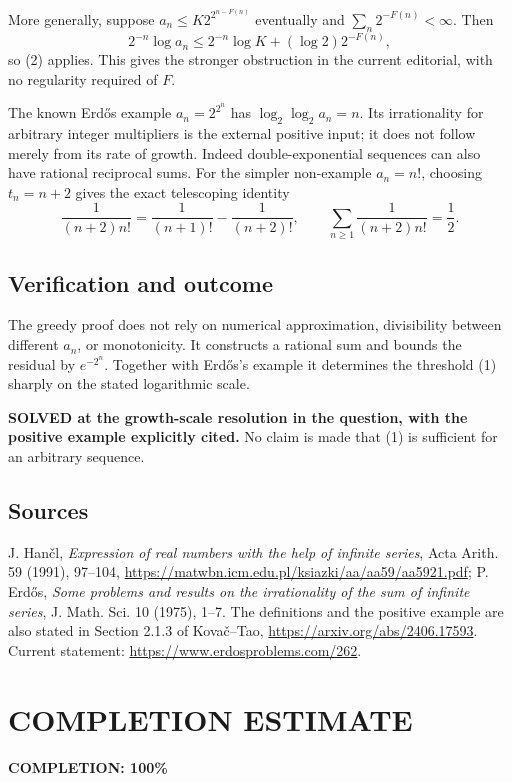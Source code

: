 More generally, suppose $a_n\le K2^{2^{n-F(n)}}$ eventually and $\sum_n2^{-F(n)}<\infty$. Then
\[
 2^{-n}\log a_n\le 2^{-n}\log K+(\log2)2^{-F(n)},
\]
so (2) applies. This gives the stronger obstruction in the current editorial, with no regularity required of $F$.

The known Erd\H{o}s example $a_n=2^{2^n}$ has
$\log_2\log_2 a_n=n$. Its irrationality for arbitrary integer multipliers is the external positive input; it does not follow merely from its rate of growth. Indeed double-exponential sequences can also have rational reciprocal sums. For the simpler non-example $a_n=n!$, choosing $t_n=n+2$ gives the exact telescoping identity
\[
 \frac1{(n+2)n!}=\frac1{(n+1)!}-\frac1{(n+2)!},
 \qquad \sum_{n\ge1}\frac1{(n+2)n!}=\frac12.
\]

\subsection{Verification and outcome}
The greedy proof does not rely on numerical approximation, divisibility between different $a_n$, or monotonicity. It constructs a rational sum and bounds the residual by $e^{-2^n}$. Together with Erd\H{o}s's example it determines the threshold (1) sharply on the stated logarithmic scale.

\textbf{SOLVED at the growth-scale resolution in the question, with the positive example explicitly cited.} No claim is made that (1) is sufficient for an arbitrary sequence.

\subsection{Sources}
J. Han\v cl, \emph{Expression of real numbers with the help of infinite series}, Acta Arith. 59 (1991), 97--104, \url{https://matwbn.icm.edu.pl/ksiazki/aa/aa59/aa5921.pdf}; P. Erd\H{o}s, \emph{Some problems and results on the irrationality of the sum of infinite series}, J. Math. Sci. 10 (1975), 1--7. The definitions and the positive example are also stated in Section 2.1.3 of Kova\v c--Tao, \url{https://arxiv.org/abs/2406.17593}. Current statement: \url{https://www.erdosproblems.com/262}.
\section{COMPLETION ESTIMATE}
\textbf{COMPLETION: 100\%}
